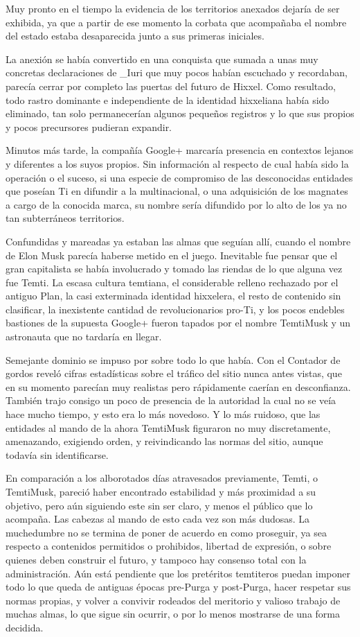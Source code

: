 \documentclass[
  spanish,
]{book}
\begin{document}
Muy pronto en el tiempo la evidencia de los territorios anexados dejaría de ser exhibida, ya que a partir de ese momento la corbata que acompañaba el nombre del estado estaba desaparecida junto a sus primeras iniciales.

La anexión se había convertido en una conquista que sumada a unas muy concretas declaraciones de \_Iuri que muy pocos habían escuchado y recordaban, parecía cerrar por completo las puertas del futuro de Hixxel. Como resultado, todo rastro dominante e independiente de la identidad hixxeliana había sido eliminado, tan solo permanecerían algunos pequeños registros y lo que sus propios y pocos precursores pudieran expandir.

Minutos más tarde, la compañía Google+ marcaría presencia en contextos lejanos y diferentes a los suyos propios. Sin información al respecto de cual había sido la operación o el suceso, si una especie de compromiso de las desconocidas entidades que poseían Ti en difundir a la multinacional, o una adquisición de los magnates a cargo de la conocida marca, su nombre sería difundido por lo alto de los ya no tan subterráneos territorios.

Confundidas y mareadas ya estaban las almas que seguían allí, cuando el nombre de Elon Musk parecía haberse metido en el juego. Inevitable fue pensar que el gran capitalista se había involucrado y tomado las riendas de lo que alguna vez fue Temti. La escasa cultura temtiana, el considerable relleno rechazado por el antiguo Plan, la casi exterminada identidad hixxelera, el resto de contenido sin clasificar, la inexistente cantidad de revolucionarios pro-Ti, y los pocos endebles bastiones de la supuesta Google+ fueron tapados por el nombre TemtiMusk y un astronauta que no tardaría en llegar.

Semejante dominio se impuso por sobre todo lo que había. Con el Contador de gordos reveló cifras estadísticas sobre el tráfico del sitio nunca antes vistas, que en su momento parecían muy realistas pero rápidamente caerían en desconfianza. También trajo consigo un poco de presencia de la autoridad la cual no se veía hace mucho tiempo, y esto era lo más novedoso. Y lo más ruidoso, que las entidades al mando de la ahora TemtiMusk figuraron no muy discretamente, amenazando, exigiendo orden, y reivindicando las normas del sitio, aunque todavía sin identificarse.

En comparación a los alborotados días atravesados previamente, Temti, o TemtiMusk, pareció haber encontrado estabilidad y más proximidad a su objetivo, pero aún siguiendo este sin ser claro, y menos el público que lo acompaña. Las cabezas al mando de esto cada vez son más dudosas. La muchedumbre no se termina de poner de acuerdo en como proseguir, ya sea respecto a contenidos permitidos o prohibidos, libertad de expresión, o sobre quienes deben construir el futuro, y tampoco hay consenso total con la administración. Aún está pendiente que los pretéritos temtiteros puedan imponer todo lo que queda de antiguas épocas pre-Purga y post-Purga, hacer respetar sus normas propias, y volver a convivir rodeados del meritorio y valioso trabajo de muchas almas, lo que sigue sin ocurrir, o por lo menos mostrarse de una forma decidida.
\end{document}
